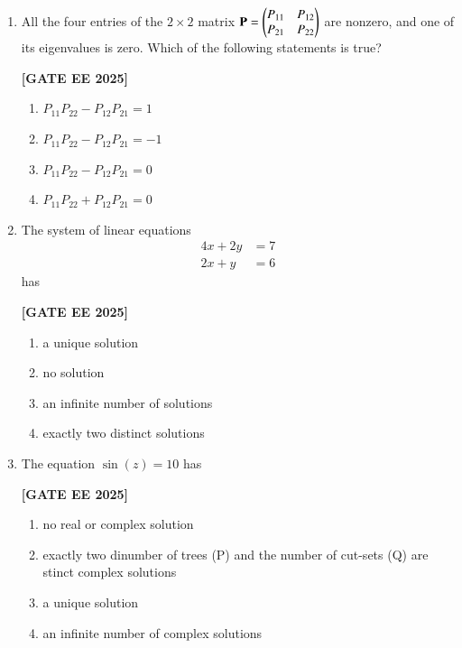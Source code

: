 \documentclass[12pt]{article}
\begin{document}
\begin{enumerate}[leftmargin=2.5em, label=\textbf{Q.\arabic*}., itemsep=2em]
\item All the four entries of the $2\times2$ matrix $\mathbf{P} = \begin{pmatrix}P_{11} & P_{12}\\ P_{21} & P_{22}\end{pmatrix}$ are nonzero, and one of its eigenvalues is zero. Which of the following statements is true?
 
\noindent \textbf{[GATE EE 2025]}
\begin{multicols}{2}
    \begin{enumerate}
        \item $P_{11}P_{22} - P_{12}P_{21} = 1$
        \item $P_{11}P_{22} - P_{12}P_{21} = -1$
        \item $P_{11}P_{22} - P_{12}P_{21} = 0$
        \item $P_{11}P_{22} + P_{12}P_{21} = 0$
    \end{enumerate}
\end{multicols}

\item The system of linear equations
\begin{align}
4x + 2y &= 7 \\
2x + y  &= 6
\end{align}
has
 
\noindent \textbf{[GATE EE 2025]}
\begin{multicols}{2}
    \begin{enumerate}
        \item a unique solution
        \item no solution
        \item an infinite number of solutions
        \item exactly two distinct solutions
    \end{enumerate}
\end{multicols}

\item The equation $\sin(z) = 10$ has
 
\noindent \textbf{[GATE EE 2025]}
    \begin{enumerate}
        \item no real or complex solution
        \item exactly two dinumber of trees (P) and the number of cut-sets (Q) are
stinct complex solutions
        \item a unique solution
        \item an infinite number of complex solutions
    \end{enumerate}


\end{enumerate}
\end{document}
